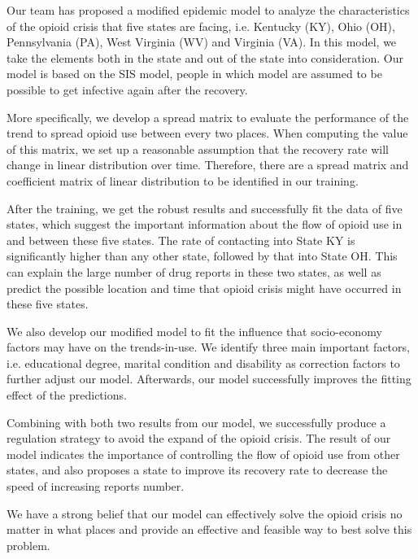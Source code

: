 \documentclass[letterpaper,11pt]{texMemo} %
\begin{document}
\maketitle %


Our team has proposed a modified epidemic model to analyze the characteristics of the opioid crisis that five states are facing, i.e. Kentucky (KY), Ohio (OH), Pennsylvania (PA), West Virginia (WV) and Virginia (VA). In this model, we take the elements both in the state and out of the state into consideration. Our model is based on the SIS model, people in which model are assumed to be possible to get infective again after the recovery.

More specifically, we develop a spread matrix to evaluate the performance of the trend to spread opioid use between every two places. When computing the value of this matrix, we set up a reasonable assumption that the recovery rate will change in linear distribution over time. Therefore, there are a spread matrix and coefficient matrix of linear distribution to be identified in our training.

After the training, we get the robust results and successfully fit the data of five states, which suggest the important information about the flow of opioid use in and between these five states. The rate of contacting into State KY is significantly higher than any other state, followed by that into State OH. This can explain the large number of drug reports in these two states, as well as predict the possible location and time that opioid crisis might have occurred in these five states.

We also develop our modified model to fit the influence that socio-economy factors may have on the trends-in-use. We identify three main important factors, i.e. educational degree, marital condition and disability as correction factors to further adjust our model. Afterwards, our model successfully improves the fitting effect of the predictions.

Combining with both two results from our model, we successfully produce a regulation strategy to avoid the expand of the opioid crisis. The result of our model indicates the importance of controlling the flow of opioid use from other states, and also proposes a state to improve its recovery rate to decrease the speed of increasing reports number.

We have a strong belief that our model can effectively solve the opioid crisis no matter in what places and provide an effective and feasible way to best solve this problem.

\end{document}
